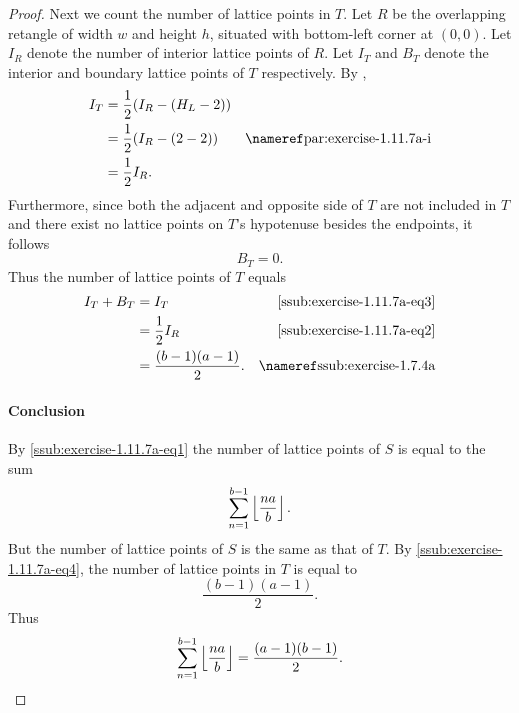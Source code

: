 \documentclass{report}
\begin{document}
\begin{proof}
    Next we count the number of lattice points in $T$.
    Let $R$ be the overlapping retangle of width $w$ and height $h$, situated
      with bottom-left corner at $(0, 0)$.
    Let $I_R$ denote the number of interior lattice points of $R$.
    Let $I_T$ and $B_T$ denote the interior and boundary lattice points of $T$
      respectively.
    By ,
      \begin{align}
        I_T
          & = \frac{1}{2}(I_R - (H_L - 2)) \nonumber \\
          & = \frac{1}{2}(I_R - (2 - 2))
            & \textref{par:exercise-1.11.7a-i} \nonumber \\
          & = \frac{1}{2}I_R. & \label{ssub:exercise-1.11.7a-eq2}
      \end{align}
    Furthermore, since both the adjacent and opposite side of $T$ are not
      included in $T$ and there exist no lattice points on $T$'s hypotenuse
      besides the endpoints, it follows
      \begin{equation}
        \label{ssub:exercise-1.11.7a-eq3}
        B_T = 0.
      \end{equation}
    Thus the number of lattice points of $T$ equals
      \begin{align}
        I_T + B_T
          & = I_T & \eqref{ssub:exercise-1.11.7a-eq3} \nonumber \\
          & = \frac{1}{2}I_R & \eqref{ssub:exercise-1.11.7a-eq2} \nonumber \\
          & = \frac{(b - 1)(a - 1)}{2}.
            & \textref{ssub:exercise-1.7.4a} \label{ssub:exercise-1.11.7a-eq4}
      \end{align}

  \paragraph{Conclusion}%

    By \eqref{ssub:exercise-1.11.7a-eq1} the number of lattice points of $S$ is
      equal to the sum $$\sum_{n=1}^{b-1} \left\lfloor\frac{na}{b}\right\rfloor.$$
    But the number of lattice points of $S$ is the same as that of $T$.
    By \eqref{ssub:exercise-1.11.7a-eq4}, the number of lattice points in $T$ is
      equal to $$\frac{(b - 1)(a - 1)}{2}.$$
    Thus $$\sum_{n=1}^{b-1} \left\lfloor\frac{na}{b}\right\rfloor = \frac{(a - 1)(b - 1)}{2}.$$

\end{proof}

\subsubsection{}%
\label{ssub:exercise-1.11.7b}
\end{document}
